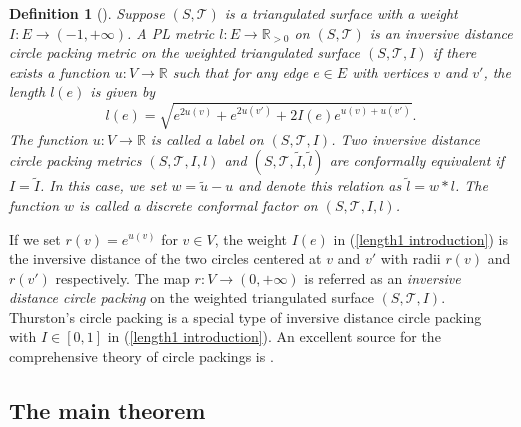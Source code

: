 \documentclass[12pt]{amsart}
\newtheorem{definition}[theorem]{Definition}
\begin{document}
\begin{definition}[\cite{BS}]\label{discrere conformal for idcp}
Suppose $(S, \mathcal{T})$ is a triangulated surface with a weight $I: E\rightarrow (-1, +\infty)$.
  A PL metric $l: E\rightarrow \mathbb{R}_{>0}$ on $(S, \mathcal{T})$
  is an inversive distance circle packing metric on the weighted triangulated surface $(S, \mathcal{T}, I)$
  if there exists a function $u: V \to \mathbb{R}$  such that for any edge $e\in E$ with vertices $v$ and $v'$, the length $ l(e)$ is given by
\begin{equation}
\label{length1 introduction}
  l(e)=\sqrt{e^{2u(v)}+e^{2u(v')}+2 I(e)e^{u(v)+u(v')}}.
\end{equation}
The function $u: V \to \mathbb{R}$ is called a label on $(S, \mathcal{T}, I)$.
Two inversive distance circle packing metrics $(S, \mathcal{T}, I, l)$ and $(S, \mathcal{T}, \tilde I, \tilde l)$ are conformally equivalent if $I = \tilde I$.
In this case, we set $w=\tilde{u}-u$ and denote this relation as $\tilde l =w*l$.  The function $w$ is called a discrete conformal factor on $(S, \mathcal{T}, I, l)$.
\end{definition}

If we set $r(v)=e^{u(v)}$ for $v\in V$, the weight $I(e)$ in (\ref{length1 introduction}) is the inversive distance of
the two circles centered at $v$ and $v'$ with radii $r(v)$ and $r(v')$ respectively.
The map $r: V\rightarrow (0, +\infty)$ is referred as an \textit{inversive distance circle packing} on the weighted
triangulated surface $(S, \mathcal{T}, I)$.
Thurston's circle packing \cite{Th} is a special type of
inversive distance circle packing with $I\in [0,1]$ in (\ref{length1 introduction}). An excellent source for the comprehensive theory of circle packings is
 \cite{St}.

\subsection{The main theorem}
\end{document}

